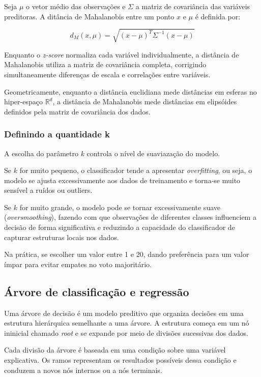 \documentclass{article}
\begin{document}
Seja $\mu$ o vetor médio das observações e $\Sigma$ a matriz de 
covariância das variáveis preditoras. A ditância de Mahalanobis 
entre um ponto $x$ e $\mu$ é definida por:

\begin{equation}
    d_M(x, \mu) = \sqrt{(x - \mu)^{T}\Sigma^{-1}(x - \mu)}
\end{equation}

Enquanto o \textit{z-score} normaliza cada variável individualmente,
a distância de Mahalanobis utiliza a matriz de covariância completa, 
corrigindo simultaneamente diferenças de escala e correlações entre 
variáveis.

Geometricamente, enquanto a distância euclidiana mede distâncias em 
esferas no hiper-espaço $\mathbb{R}^{d}$, a distância de Mahalanobis 
mede distâncias em elipsóides definidos pela matriz de covariância 
dos dados.

\subsubsection{Definindo a quantidade k}

A escolha do parâmetro $k$ controla o nível de suaviazação do modelo.

Se $k$ for muito pequeno, o classificador tende a apresentar \textit{overfitting},
ou seja, o modelo se ajusta excessivamente aos dados de treinamento e torna-se 
muito sensível a ruídos ou outliers.

Se $k$ for muito grande, o modelo pode se tornar excessivamente suave (\textit{oversmoothing}),
fazendo com que observações de diferentes classes influenciem a decisão de forma 
significativa e reduzindo a capacidade do classificador de capturar estruturas locais nos dados.

Na prática, se escolher um valor entre 1 e 20, dando preferência para um valor 
ímpar para evitar empates no voto majoritário.

\subsection{Árvore de classificação e regressão}

Uma árvore de decisão é um modelo preditivo que organiza decisões
em uma estrutura hierárquica semelhante a uma árvore. A estrutura 
começa em um nó ininicial chamado \textit{root} e se expande por 
meio de divisões sucessivas dos dados.

Cada divisão da árvore é baseada em uma condição sobre uma variável
explicativa. Os ramos representam os resultados possíveis dessa 
condição e conduzem a novos nós internos ou a nós terminais.
\end{document}
